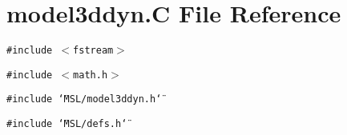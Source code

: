 \section{model3ddyn.C File Reference}
\label{model3ddyn_8C}
{\tt \#include $<$fstream$>$}\par
{\tt \#include $<$math.h$>$}\par
{\tt \#include \char`\"{}MSL/model3ddyn.h\char`\"{}}\par
{\tt \#include \char`\"{}MSL/defs.h\char`\"{}}\par
